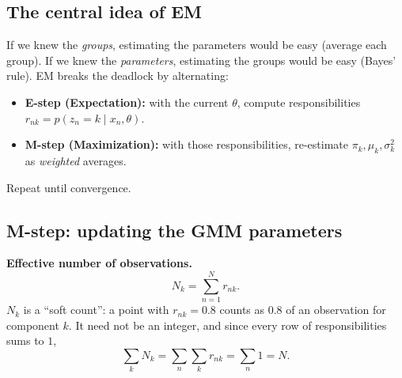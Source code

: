 \documentclass[11pt,a4paper]{article}
\newcommand{\LL}{\mathcal{L}}
\begin{document}
\subsection{The central idea of EM}

\begin{keyidea}
If we knew the \emph{groups}, estimating the parameters would be easy (average each group). If we knew the \emph{parameters}, estimating the groups would be easy (Bayes' rule). EM breaks the deadlock by alternating:
\begin{itemize}[nosep]
\item \textbf{E-step (Expectation):} with the current $\theta$, compute responsibilities $r_{nk}=p(z_n=k\mid x_n,\theta)$.
\item \textbf{M-step (Maximization):} with those responsibilities, re-estimate $\pi_k,\mu_k,\sigma_k^2$ as \emph{weighted} averages.
\end{itemize}
Repeat until convergence.
\end{keyidea}

\begin{center}
\end{center}

\subsection{M-step: updating the GMM parameters}

\textbf{Effective number of observations.}
\[
N_k=\sum_{n=1}^N r_{nk}.
\]
$N_k$ is a ``soft count'': a point with $r_{nk}=0.8$ counts as $0.8$ of an observation for component $k$. It need not be an integer, and since every row of responsibilities sums to $1$,
\[
\sum_kN_k=\sum_n\sum_kr_{nk}=\sum_n1=N.
\]
\end{document}
